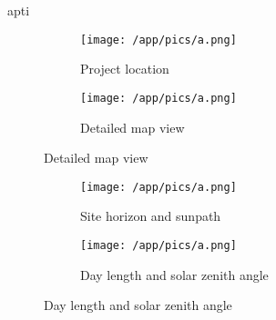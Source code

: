 apti     \documentclass[10pt,a4paper,UTF8]{article}
\begin{document}
{%
\begin{figure}[H]  %
    \begin{minipage}[t]{0.48\textwidth}
    \centering
    \begin{figure}[H]
    \vspace*{-5mm}
    \caption{ Project location }
    \texttt{[image: /app/pics/a.png]}
    \end{figure}
    \end{minipage}
    \hfill
\centering
    \begin{minipage}[t]{0.48\textwidth}
    \centering
    \begin{figure}[H]
    \vspace*{-5mm}
    \caption{ Detailed map view }
    \texttt{[image: /app/pics/a.png]}
    \end{figure}
    \end{minipage}
    \hfill
\end{figure}%
\begin{figure}[H]  %
    \begin{minipage}[t]{0.48\textwidth}
    \centering
    \begin{figure}[H]
    \vspace*{-5mm}
    \caption{ Site horizon and sunpath }
    \texttt{[image: /app/pics/a.png]}
    \end{figure}
    \end{minipage}
    \hfill
\centering
    \begin{minipage}[t]{0.48\textwidth}
    \centering
    \begin{figure}[H]
    \vspace*{-5mm}
    \caption{ Day length and solar zenith angle }
    \texttt{[image: /app/pics/a.png]}
    \end{figure}
    \end{minipage}
    \hfill
\end{figure}\newpage{}
}
\end{document}
